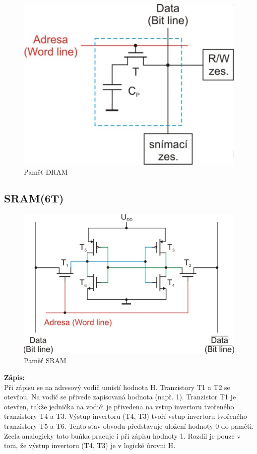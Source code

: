    \begin{figure}[h]
   \begin{center}
     \includegraphics[scale=0.6]{images/DRAM2.png}
   \end{center}
   \caption{Paměť DRAM}
  \end{figure}
\pagebreak
\subsection{SRAM(6T)}
   \begin{figure}[h]
   \begin{center}
     \includegraphics[scale=0.6]{images/SRAM.png}
   \end{center}
   \caption{Paměť SRAM}
  \end{figure}
\textbf{Zápis:}\\
Při zápisu se na adresový vodič umístí hodnota H. Tranzistory T1 a T2 se otevřou.
Na vodič se přivede zapisovaná hodnota (např. 1). Tranzistor T1 je otevřen, takže jednička na vodiči je přivedena na vstup invertoru tvořeného tranzistory T4 a T3.
Výstup invertoru (T4, T3) tvoří vstup invertoru tvořeného tranzistory T5 a T6. Tento stav obvodu představuje uložení hodnoty 0 do paměti. Zcela analogicky tato buňka pracuje i při zápisu hodnoty 1. Rozdíl je pouze v tom, že výstup invertoru (T4, T3) je v logické úrovni H.

